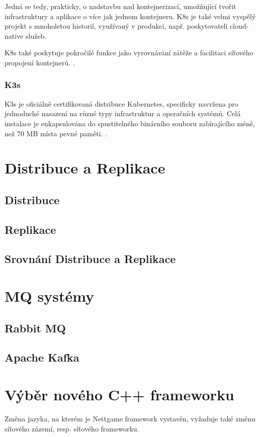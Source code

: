 \documentclass{article}
\begin{document}
Jedná se tedy, prakticky, o nadstavbu nad kontejnerizací, umožňující tvořit infrastruktury a aplikace o více jak jednom kontejneru. K8s je také velmi vyspělý projekt s mnoholetou historií, využívaný v produkci, např. poskytovateli cloud-native služeb.

K8s také poskytuje pokročilé funkce jako vyrovnávání zátěže a facilitaci síťového propojení kontejnerů. \cite{kubernetes_home}.



\subsubsection{K3s}
K3s je oficiálně certifikovaná distribuce Kubernetes, specificky navržena pro jednoduché nasazení na různé typy infrastruktur a operačních systémů. Celá instalace je enkapsulována do spustitelného binárního souboru zabírajícího méně, než 70 MB místa pevné paměti. \cite{k3s}.
\newpage
\section{Distribuce a Replikace}
\subsection{Distribuce}
\subsection{Replikace}
\subsection{Srovnání Distribuce a Replikace}
\newpage
\section{MQ systémy}
\subsection{Rabbit MQ}
\subsection{Apache Kafka}
\newpage
\section{Výběr nového C++ frameworku}
Změna jazyka, na kterém je Nettgame framework vystavěn, vyžaduje také změnu síťového zázemí, resp. síťového frameworku.
\end{document}
